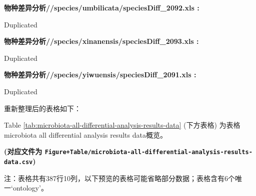 \documentclass[
]{article}
\begin{document}
\begin{center}
\begin{tcolorbox}[colback=gray!10, colframe=gray!50, width=0.9\linewidth, arc=1mm, boxrule=0.5pt]
\vspace{2em}


\textbf{
物种差异分析//species/umbilicata/speciesDiff\_2092.xls
:}

\vspace{0.5em}

    Duplicated

\vspace{2em}


\textbf{
物种差异分析//species/xinanensis/speciesDiff\_2093.xls
:}

\vspace{0.5em}

    Duplicated

\vspace{2em}


\textbf{
物种差异分析//species/yiwuensis/speciesDiff\_2091.xls
:}

\vspace{0.5em}

    Duplicated

\vspace{2em}
\end{tcolorbox}
\end{center}

重新整理后的表格如下：

Table \ref{tab:microbiota-all-differential-analysis-results-data} (下方表格) 为表格microbiota all differential analysis results data概览。

\textbf{(对应文件为 \texttt{Figure+Table/microbiota-all-differential-analysis-results-data.csv})}

\begin{center}\begin{tcolorbox}[colback=gray!10, colframe=gray!50, width=0.9\linewidth, arc=1mm, boxrule=0.5pt]注：表格共有387行10列，以下预览的表格可能省略部分数据；表格含有6个唯一`ontology'。
\end{tcolorbox}
\end{center}
\end{document}
